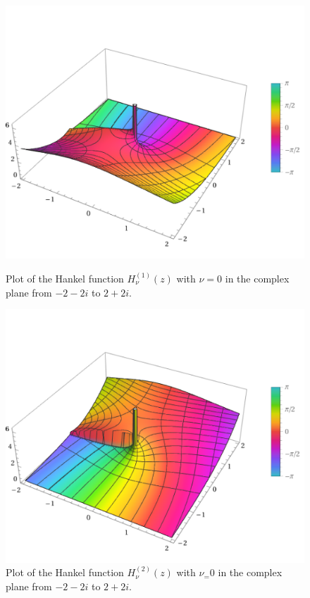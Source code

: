 \begin{figure}[H]
    \centering
    \begin{minipage}{.5\textwidth}
        \centering
        \includegraphics[width=\linewidth]{Images/Bessel/hankel_1_0_z.png}
        \captionsetup{width=0.9\linewidth} %
        \caption{Plot of the Hankel function \(H_\nu^{(1)}(z)\) with \(\nu=0\) in the complex plane from \(-2-2i\) to \(2+2i\).}
        \label{hankel_function_1_complex_plot}
    \end{minipage}%
    \begin{minipage}{.5\textwidth}
        \centering
        \includegraphics[width=\linewidth]{Images/Bessel/hankel_2_0_z.png}
        \captionsetup{width=0.9\linewidth} %
        \caption{Plot of the Hankel function \(H_\nu^{(2)}(z)\) with \(\nu_=0\) in the complex plane from \(-2-2i\) to \(2+2i\).}
        \label{hankel_function_2_complex_plot}
    \end{minipage}
\end{figure}

